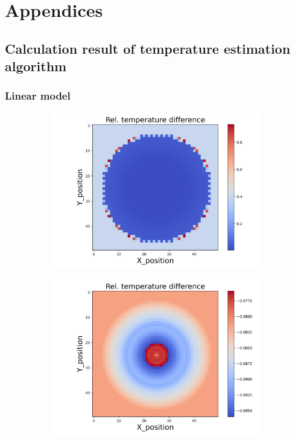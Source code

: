 \chapter{Appendices}%
\section{Calculation result of temperature estimation algorithm}

\subsection{Linear model}
\begin{figure}[h]
    \centering
    \begin{minipage}{\textwidth}
        \centering
        \begin{subfigure}{0.325\textwidth}
            \centering
            \includegraphics[width=\textwidth]{figures/raw_data/0/linear/T_bias.jpg}
        \end{subfigure}
        \begin{subfigure}{0.325\textwidth}
            \centering
            \includegraphics[width=\textwidth]{figures/raw_data/5/linear/T_bias.jpg}

\end{subfigure}
\end{minipage}
\end{figure}
